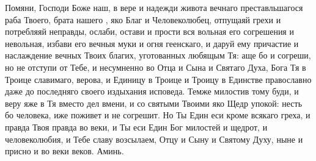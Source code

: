 \mychapterending

\begin{mymulticols}

Помяни, Господи Боже наш, в вере и надежди живота вечнаго преставльшагося раба Твоего, брата нашего , яко Благ и Человеколюбец, отпущаяй грехи и потребляяй неправды, ослаби, остави и прости вся вольная его согрешения и невольная, избави его вечныя муки и огня геенскаго, и даруй ему причастие и наслаждение вечных Твоих благих, уготованных любящым Тя: аще бо и согреши, но не отступи от Тебе, и несумненно во Отца и Сына и Святаго Духа, Бога Тя в Троице славимаго, верова, и Единицу в Троице и Троицу в Единстве православно даже до последняго своего издыхания исповеда. Темже милостив тому буди, и веру яже в Тя вместо дел вмени, и со святыми Твоими яко Щедр упокой: несть бо человека, иже поживет и не согрешит. Но Ты Един еси кроме всякаго греха, и правда Твоя правда во веки, и Ты еси Един Бог милостей и щедрот, и человеколюбия, и Тебе славу возсылаем, Отцу и Сыну и Святому Духу, ныне и присно и во веки веков. Аминь. 

\end{mymulticols}

\mychapterending


\vspace{-\baselineskip}

